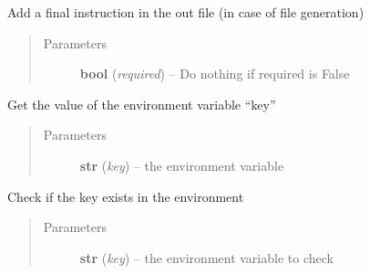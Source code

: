 \documentclass[a4paper,10pt,english]{sphinxmanual}
\begin{document}
\begin{fulllineitems}

\begin{fulllineitems}
\label{commands/apidoc/src:src.fileEnviron.FileEnviron.finish}
Add a final instruction in the out file (in case of file generation)
\begin{quote}\begin{description}
\item[{Parameters}] \leavevmode
\textbf{bool} (\emph{required}) -- Do nothing if required is False

\end{description}\end{quote}

\end{fulllineitems}


\begin{fulllineitems}
\label{commands/apidoc/src:src.fileEnviron.FileEnviron.get}
Get the value of the environment variable ``key''
\begin{quote}\begin{description}
\item[{Parameters}] \leavevmode
\textbf{str} (\emph{key}) -- the environment variable

\end{description}\end{quote}

\end{fulllineitems}


\begin{fulllineitems}
\label{commands/apidoc/src:src.fileEnviron.FileEnviron.is_defined}
Check if the key exists in the environment
\begin{quote}\begin{description}
\item[{Parameters}] \leavevmode
\textbf{str} (\emph{key}) -- the environment variable to check

\end{description}\end{quote}

\end{fulllineitems}


\end{fulllineitems}
\end{document}
